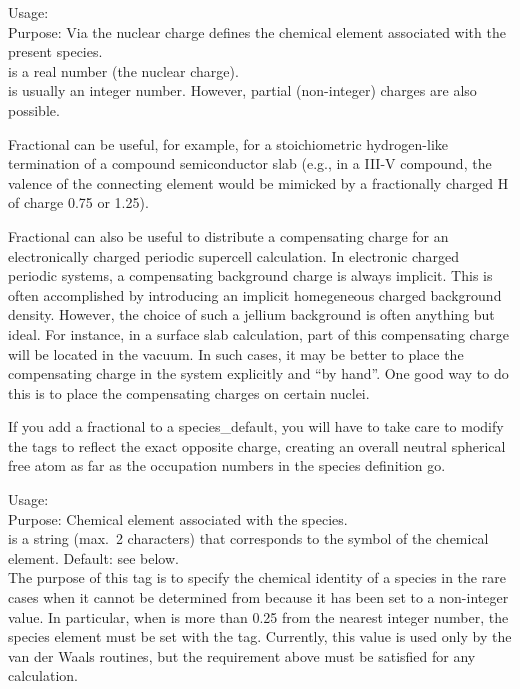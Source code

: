 {
  \noindent
  Usage:   \\[1.0ex]
  Purpose: Via the nuclear charge defines the chemical element associated with
    the present species.\\[1.0ex]
   is a real number (the nuclear charge). \\
}
 is usually an integer number. However, partial (non-integer) charges
are also possible. 

Fractional  can be useful, for example, for a stoichiometric hydrogen-like 
termination of a compound semiconductor slab (e.g., in a III-V compound, the valence of
the connecting element would be mimicked by a fractionally charged H
of charge 0.75 or 1.25). 

Fractional  can also be useful to
distribute a compensating charge for an electronically charged
periodic supercell calculation. In electronic charged periodic systems, a
compensating background charge is always implicit. This is often
accomplished by introducing an implicit homegeneous charged background
density. However, the choice of such a jellium background is often
anything but ideal. For instance, in a surface slab calculation, part
of this compensating charge will be located in the vacuum. In such
cases, it may be better to place the compensating charge in the system
explicitly and ``by hand''. One good way to do this is to place the
compensating charges on certain nuclei.\cite{Richter2013}

If you add a fractional  to a species\_default, you will
have to take care to modify the  tags to
reflect the exact opposite charge, creating an overall neutral
spherical free atom as far as the 
occupation numbers in the species definition go. 

{
  \noindent
  Usage:   \\[1.0ex]
  Purpose: Chemical element associated with the species.\\[1.0ex]
   is a string (max.\ 2 characters) that corresponds to the symbol
  of the chemical element. Default: see below.\\
}
The purpose of this tag is to specify the chemical identity of a species in the
rare cases when it cannot be determined from  because it has been set
to a non-integer value. In particular, when  is more than 0.25 from
the nearest integer number, the species element must be set with the
 tag. Currently, this value is used only by the
van der Waals routines, but the requirement above must be satisfied for any
calculation.
